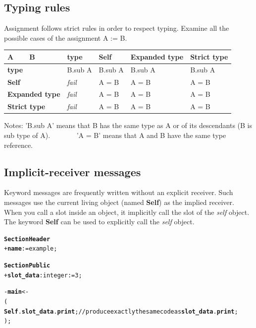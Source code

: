 \documentclass[11pt]{mybook}
\begin{document}
\subsection{Typing rules}
\label{language_reference:slot_evaluation:typing_rules}
Assignment follows strict rules in order to respect typing.
Examine all the possible cases of the assignment A := B.

\noindent
\begin{tabularx}{\textwidth}{l X X l X}
\hline
{\bf{}A~~~~B}     & {\bf{}type} & {\bf{}Self} & {\bf{}Expanded type} & {\bf{}Strict type} \\
\hline
\hline
 {\bf{}type}      & B.sub A     & B.sub A     & B.sub A         & B.sub A       \\
\hline
 {\bf{}Self}      & {\it{}fail} & A = B       & A = B           & A = B        \\
\hline
 {\bf{}Expanded type}  & {\it{}fail} & A = B       & A = B           & A = B      \\
\hline
 {\bf{}Strict type}    & {\it{}fail} & A = B       & A = B           & A = B   \\
\hline
\end{tabularx}

\noindent
Notes: 'B.sub A' means that B has the same type as A or of its descendants (B is sub type of A).
~~~~~~~'A = B' means that A and B have the same type reference.

\subsection{Implicit-receiver messages}
\label{language_reference:late_binding:implicit_receiver}
%
Keyword messages are frequently written without an explicit 
receiver. 
Such messages use the current living object (named {\bf{}Self}) as the implied receiver. 
When you call a slot inside an object, it implicitly call the slot of the {\it{}self} object.
The keyword {\bf{}Self} can be used to explicitly call the {\it{}self} object.

\begin{alltt} 
{\bf{}Section Header}
  + {\bf{}name}     := {\sc{}example};          

{\bf{}Section Public}
  + {\bf{}slot\_data}:{\sc{}integer} := 3;

  - {\bf{}main} <-
  ( 
     {\bf{}Self}.{\bf{}slot\_data}.{\bf{}print};    // produce exactly the same code as {\bf{}slot\_data}.{\bf{}print};
  );
\end{alltt}
\end{document}
